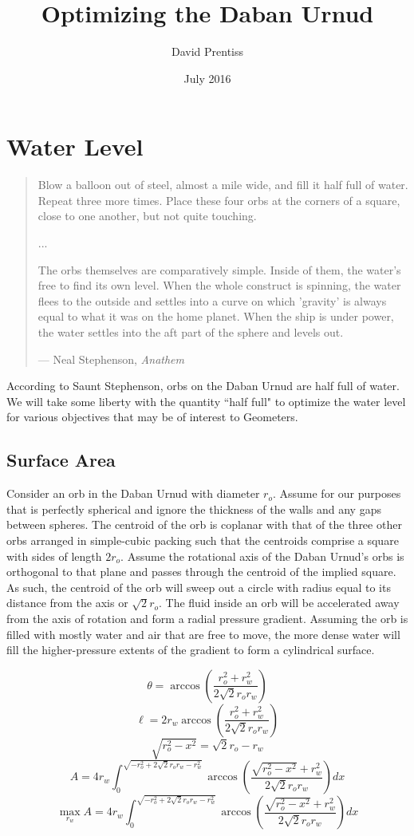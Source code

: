 \documentclass[letterpaper, 10pt]{amsart}
\title{Optimizing the Daban Urnud}
\author{David Prentiss}
\date{July 2016}
\begin{document}
\maketitle

\section{Water Level}

\begin{quote}
Blow a balloon out of steel, almost a mile wide, and fill it half full of water. Repeat three more times. Place these four orbs at the corners of a square, close to one another, but not quite touching.

...

The orbs themselves are comparatively simple. Inside of them, the water's free to find its own level. When the whole construct is spinning, the water flees to the outside and settles into a curve on which 'gravity' is always equal to what it was on the home planet. When the ship is under power, the water settles into the aft part of the sphere and levels out. 

--- Neal Stephenson, \em{Anathem}
\end{quote}



According to Saunt Stephenson, orbs on the Daban Urnud are half full of water.
We will take some liberty with the quantity ``half full" to optimize the water level for various objectives that may be of interest to Geometers. 

\subsection{Surface Area}

Consider an orb in the Daban Urnud with diameter $r_o$.
Assume for our purposes that is perfectly spherical and ignore the thickness of the walls and any gaps between spheres.
The centroid of the orb is coplanar with that of the three other orbs arranged in simple-cubic packing such that the centroids comprise a square with sides of length $2r_o$. 
Assume the rotational axis of the Daban Urnud's orbs is orthogonal to that plane and passes through the centroid of the implied square.
As such, the centroid of the orb will sweep out a circle with radius equal to its distance from the axis or $\sqrt{2}r_o$.
The fluid inside an orb will be accelerated away from the axis of rotation and form a radial pressure gradient.
Assuming the orb is filled with mostly water and air that are free to move, the more dense water will fill the higher-pressure extents of the gradient to form a cylindrical surface.


\[
    \theta = \arccos \left(\frac{r_o^2+r_w^2}{2 \sqrt{2} r_o r_w}\right)
    \]
\[
    \ell = 2 r_w\arccos \left(\frac{r_o^2+r_w^2}{2 \sqrt{2} r_o r_w}\right)
    \]
\[
    \sqrt{r_o^2-x^2} = \sqrt{2}r_o - r_w
    \]
\[
    A = 4 r_w \int_0^{\sqrt{-r_o^2+2\sqrt{2}r_o r_w-r_w^2}} \arccos \left(\frac{\sqrt{r_o^2-x^2}+r_w^2}{2 \sqrt{2} r_o r_w}\right) dx
    \]
\[
    \max_{r_w} A = 4 r_w \int_0^{\sqrt{-r_o^2+2\sqrt{2}r_o r_w-r_w^2}} \arccos \left(\frac{\sqrt{r_o^2-x^2}+r_w^2}{2 \sqrt{2} r_o r_w}\right) dx
    \]
    
\end{document}
